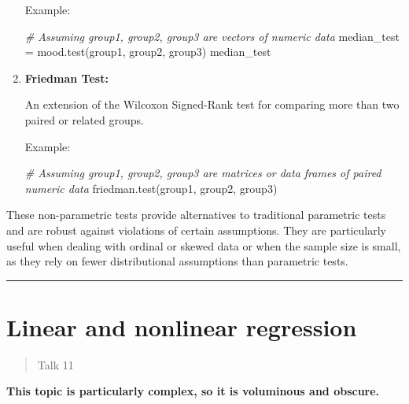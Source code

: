 \documentclass[
]{article}
\newenvironment{Shaded}{}{}
\newcommand{\CommentTok}[1]{\textcolor[rgb]{0.38,0.63,0.69}{\textit{#1}}}
\newcommand{\FunctionTok}[1]{\textcolor[rgb]{0.02,0.16,0.49}{#1}}
\newcommand{\NormalTok}[1]{#1}
\newcommand{\OtherTok}[1]{\textcolor[rgb]{0.00,0.44,0.13}{#1}}
\begin{document}
\begin{enumerate}
  Example:

\begin{Shaded}
\begin{Highlighting}[]
\CommentTok{\# Assuming \textquotesingle{}group1\textquotesingle{}, \textquotesingle{}group2\textquotesingle{}, \textquotesingle{}group3\textquotesingle{} are vectors of numeric data}
\NormalTok{median\_test }\OtherTok{=} \FunctionTok{mood.test}\NormalTok{(group1, group2, group3)}
\NormalTok{median\_test}
\end{Highlighting}
\end{Shaded}
\item
  \textbf{Friedman Test:}

  An extension of the Wilcoxon Signed-Rank test for comparing more than
  two paired or related groups.

  Example:

\begin{Shaded}
\begin{Highlighting}[]
\CommentTok{\# Assuming \textquotesingle{}group1\textquotesingle{}, \textquotesingle{}group2\textquotesingle{}, \textquotesingle{}group3\textquotesingle{} are matrices or data frames of paired numeric data}
\FunctionTok{friedman.test}\NormalTok{(group1, group2, group3)}
\end{Highlighting}
\end{Shaded}
\end{enumerate}

These non-parametric tests provide alternatives to traditional
parametric tests and are robust against violations of certain
assumptions. They are particularly useful when dealing with ordinal or
skewed data or when the sample size is small, as they rely on fewer
distributional assumptions than parametric tests.

\begin{center}\rule{0.5\linewidth}{0.5pt}\end{center}

\hypertarget{linear-and-nonlinear-regression}{%
\section{Linear and nonlinear
regression}\label{linear-and-nonlinear-regression}}

\begin{quote}
Talk 11
\end{quote}

\textbf{This topic is particularly complex, so it is voluminous and
obscure.}
\end{document}
